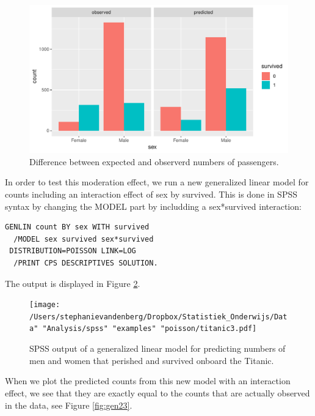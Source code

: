 \documentclass[]{book}\usepackage[]{graphicx}\usepackage[]{color}
\makeatletter
\def\maxwidth{ %
  \ifdim\Gin@nat@width>\linewidth
    \linewidth
  \else
    \Gin@nat@width
  \fi
}
\makeatother
\begin{document}
\begin{figure}

{\centering \includegraphics[width=\maxwidth]{figure/gen_22-1} 

}

\caption[Difference between expected and observerd numbers of passengers]{Difference between expected and observerd numbers of passengers.}\label{fig:gen_22}
\end{figure}




In order to test this moderation effect, we run a new generalized linear model for counts including an interaction effect of sex by survived. This is done in SPSS syntax by changing the MODEL part by includding a sex*survived interaction:


\begin{verbatim}
GENLIN count BY sex WITH survived
  /MODEL sex survived sex*survived
 DISTRIBUTION=POISSON LINK=LOG
  /PRINT CPS DESCRIPTIVES SOLUTION.
\end{verbatim}


The output is displayed in Figure \ref{fig:titanic3}.


\begin{figure}[h]
    \begin{center}
       \texttt{[image: /Users/stephanievandenberg/Dropbox/Statistiek\_Onderwijs/Data" "Analysis/spss" "examples" "poisson/titanic3.pdf]}
    \end{center}
     \caption{SPSS output of a generalized linear model for predicting numbers of men and women that perished and survived onboard the Titanic.}
    \label{fig:titanic3}
\end{figure}



When we plot the predicted counts from this new model with an interaction effect, we see that they are exactly equal to the counts that are actually observed in the data, see Figure \ref{fig:gen23}.
\end{document}
